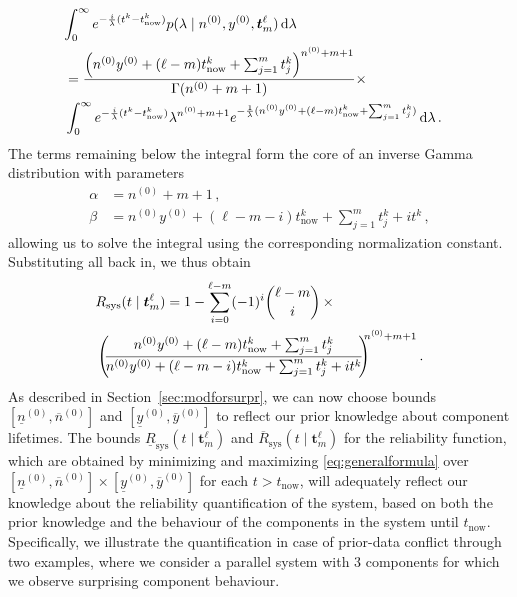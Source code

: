 \documentclass[12pt,a4paper,twocolumn,fleqn]{narms}
\newcommand{\dd}{\,\mathrm{d}}
\renewcommand{\vec}[1]{{\bm#1}}
\newcommand{\uz}{^{(0)}} %
\newcommand{\ul}[1]{\underline{#1}}
\newcommand{\ol}[1]{\overline{#1}}
\newcommand{\lRsys}{\ul{R}_\text{sys}}
\newcommand{\uRsys}{\ol{R}_\text{sys}}
\def\yz{y\uz}
\def\yzl{\ul{y}\uz}
\def\yzu{\ol{y}\uz}
\def\nz{n\uz}
\def\nzl{\ul{n}\uz}
\def\nzu{\ol{n}\uz}
\begin{document}
\begin{align}
\lefteqn{%
    \int_0^\infty e^{-\frac{i}{\lambda} (t^k - t_\text{now}^k)} %
    p(\lambda \mid \nz, \yz, \vec{t}_m^\ell) \dd\lambda } \\
 &= \frac{\left(\nz \yz + (\ell-m) t_\text{now}^k + \sum_{j=1}^{m} t_j^k \right)^{\nz + m + 1}}{\Gamma(\nz + m + 1)}\times \\
 &  \int_0^\infty e^{-\frac{i}{\lambda} (t^k - t_\text{now}^k)} \lambda^{\nz + m + 1}
    e^{-\frac{1}{\lambda}(\nz \yz + (\ell-m) t_\text{now}^k + \sum_{j=1}^m t_j^k)} \dd\lambda\,.
\end{align}
The terms remaining below the integral form the core of an inverse Gamma distribution
with parameters
\begin{align}
\alpha &= \nz + m + 1\,,\\
\beta  &= \nz \yz + (\ell - m - i) t_\text{now}^k + \sum_{j=1}^{m} t_j^k + i t^k\,,
\end{align}
allowing us to solve the integral using the corresponding normalization constant.
%
Substituting all back in, we thus obtain
\begin{align}
\label{eq:generalformula}
\lefteqn{%
R_\text{sys}(t \mid \vec{t}_m^\ell)
  = 1 - \sum_{i=0}^{\ell-m} (-1)^i {\ell-m \choose i} \, \times } & \\
 & %
   \left(\!\! \frac{\nz \yz + (\ell-m)   t_\text{now}^k + \sum_{j=1}^{m} t_j^k}%
                   {\nz \yz + (\ell-m-i) t_\text{now}^k + \sum_{j=1}^{m} t_j^k + i t^k} \!\!\right)^{\!\!\!\nz + m + 1}.
\end{align}
%
As described in Section~\ref{sec:modforsurpr},
we can now choose bounds $[\nzl, \nzu]$ and $[\yzl, \yzu]$
to reflect our prior knowledge about component lifetimes.
The bounds $\lRsys(t \mid \vec{t}_m^\ell)$ and $\uRsys(t \mid \vec{t}_m^\ell)$ for the reliability function,
which are obtained by minimizing and maximizing \eqref{eq:generalformula}
over $[\nzl, \nzu] \times [\yzl, \yzu]$ for each $t > t_\text{now}$,
will adequately reflect our knowledge about the reliability quantification of the system,
based on both the prior knowledge and the behaviour of the components in the system until $t_\text{now}$.
Specifically, we illustrate the quantification in case of prior-data conflict through two examples,
where we consider a parallel system with 3 components
for which we observe surprising component behaviour.
\end{document}
